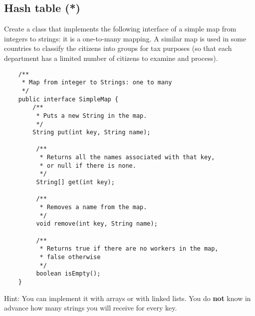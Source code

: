\documentclass{article}
\begin{document}
\subsection{Hash table (*)}
\label{sec:simple-map-2}

Create a class that implements the following interface of a simple map
from integers to strings: it is a one-to-many mapping. 
A similar map is used in some countries to
classify the citizens into groups for tax purposes (so that each
department has a limited number of citizens to examine and process). 

\begin{verbatim}
    /**
     * Map from integer to Strings: one to many
     */
    public interface SimpleMap {
        /**
         * Puts a new String in the map. 
         */
        String put(int key, String name);
    
         /**
          * Returns all the names associated with that key, 
          * or null if there is none.
          */
         String[] get(int key);
    
         /**
          * Removes a name from the map.
          */
         void remove(int key, String name);
    
         /** 
          * Returns true if there are no workers in the map, 
          * false otherwise
          */
         boolean isEmpty();
    }
\end{verbatim}

Hint: You can implement it with arrays or with linked lists. You do
\textbf{not} know in advance how many strings you will receive for
every key.  


    



    

\end{document}
